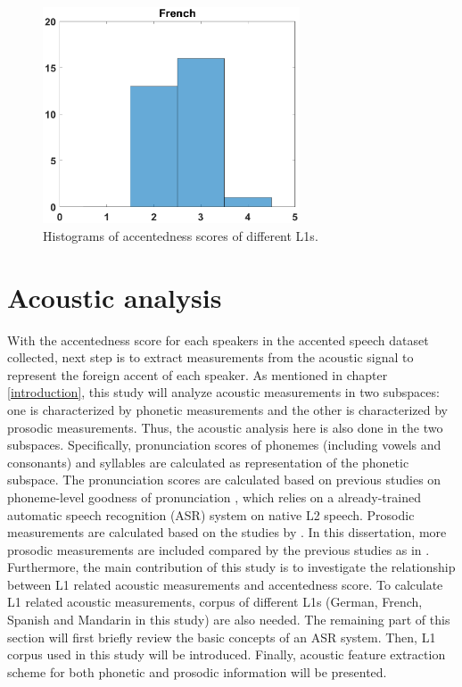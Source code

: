 \begin{figure}[h]
\begin{minipage}[t]{0.5\linewidth}
        \end{minipage}%
        \begin{minipage}[t]{0.5\linewidth}
        \centering
            \includegraphics[width=3in]{figures/French_hist.eps}
        \end{minipage}%
        \caption{Histograms of accentedness scores of different L1s.}
        \centering
        \label{fig0}
     \end{figure}

\section{Acoustic analysis}

With the accentedness score for each speakers in the accented speech dataset collected, next step is to extract measurements from the acoustic signal to represent the foreign accent of each speaker. As mentioned in chapter \ref{introduction}, this study will analyze acoustic measurements in two subspaces: one is characterized by phonetic measurements and the other is characterized by prosodic measurements. Thus, the acoustic analysis here is also done in the two subspaces. Specifically, pronunciation scores of phonemes (including vowels and consonants) and syllables are calculated as representation of the phonetic subspace. The pronunciation scores are calculated based on previous studies on phoneme-level goodness of pronunciation \citep{witt2000phone}, which relies on a already-trained automatic speech recognition (ASR) system on native L2 speech. Prosodic measurements are calculated based on the studies by \cite{ramus1999correlates,grabe2002durational}. In this dissertation, more prosodic measurements are included compared by the previous studies as in \citep{lai2013applying}. Furthermore, the main contribution of this study is to investigate the relationship between L1 related acoustic measurements and accentedness score. To calculate L1 related acoustic measurements, corpus of different L1s (German, French, Spanish and Mandarin in this study) are also needed. The remaining part of this section will first briefly review the basic concepts of an ASR system. Then, L1 corpus used in this study will be introduced. Finally, acoustic feature extraction scheme for both phonetic and prosodic information will be presented.

